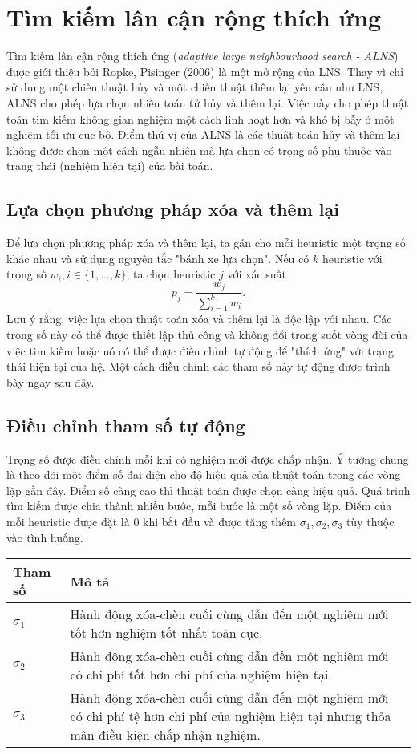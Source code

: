 \section{Tìm kiếm lân cận rộng thích ứng}
Tìm kiếm lân cận rộng thích ứng (\textit{adaptive large neighbourhood search - ALNS}) được giới thiệu bởi Ropke, Pisinger (2006) \cite{ropke2006adaptive} là một mở rộng của LNS. Thay vì chỉ sử dụng một chiến thuật hủy và một chiến thuật thêm lại yêu cầu như LNS, ALNS cho phép lựa chọn nhiều toán tử hủy và thêm lại. Việc này cho phép thuật toán tìm kiếm không gian nghiệm một cách linh hoạt hơn và khó bị bẫy ở một nghiệm tối ưu cục bộ. Điểm thú vị của ALNS là các thuật toán hủy và thêm lại không được chọn một cách ngẫu nhiên mà lựa chọn có trọng số phụ thuộc vào trạng thái (nghiệm hiện tại) của bài toán.

\subsection{Lựa chọn phương pháp xóa và thêm lại}
Để lựa chọn phương pháp xóa và thêm lại, ta gán cho mỗi heuristic một trọng số khác nhau và sử dụng nguyên tắc "bánh xe lựa chọn". Nếu có $k$ heuristic với trọng số $w_i, i \in \{1,...,k\}$, ta chọn heuristic $j$ với xác suất
\begin{equation}
	\label{eq:select}
	p_j = \frac{w_j}{\sum_{i=1}^k w_i}.
\end{equation}
Lưu ý rằng, việc lựa chọn thuật toán xóa và thêm lại là độc lập với nhau. Các trọng số này có thể được thiết lập thủ công và không đổi trong suốt vòng đời của việc tìm kiếm hoặc nó có thể được điều chỉnh tự động để "thích ứng" với trạng thái hiện tại của hệ. Một cách điều chỉnh các tham số này tự động được trình bày ngay sau đây.

\subsection{Điều chỉnh tham số tự động}
Trọng số được điều chỉnh mỗi khi có nghiệm mới được chấp nhận. Ý tưởng chung là theo dõi một điểm số đại diện cho độ hiệu quả của thuật toán trong các vòng lặp gần đây. Điểm số càng cao thì thuật toán được chọn càng hiệu quả. Quá trình tìm kiếm được chia thành nhiều bước, mỗi bước là một số vòng lặp. Điểm của mỗi heuristic được đặt là $0$ khi bắt đầu và được tăng thêm $\sigma_1, \sigma_2, \sigma_3$ tùy thuộc vào tình huống.
\begin{table}[caption={Tham số cập nhật trọng số}, label=tab:weight]
	\begin{tabularx}{\textwidth}{|l|X|}
		\hline
		Tham số    & Mô tả  \\ \hline
		$\sigma_1$ & Hành động xóa-chèn cuối cùng dẫn đến một nghiệm mới tốt hơn nghiệm tốt nhất toàn cục. \\ \hline
		$\sigma_2$ & Hành động xóa-chèn cuối cùng dẫn đến một nghiệm mới có chi phí tốt hơn chi phí của nghiệm hiện tại. \\ \hline
		$\sigma_3$ & Hành động xóa-chèn cuối cùng dẫn đến một nghiệm mới có chi phí tệ hơn chi phí của nghiệm hiện tại nhưng thỏa mãn điều kiện chấp nhận nghiệm. \\ \hline
	\end{tabularx}
\end{table}

